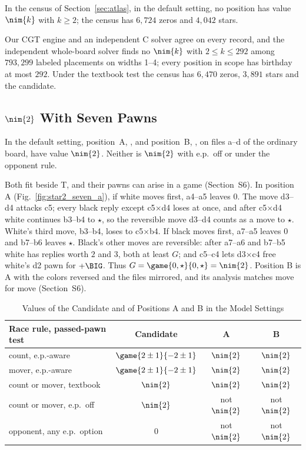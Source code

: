 \begin{theorem}\label{thm:census}
In the census of Section~\ref{sec:atlas}, in the default setting, no position has value $\nim{k}$ with
$k\ge2$; the census has $6{,}724$ zeros and $4{,}042$ stars.
\end{theorem}

Our CGT engine and an independent C solver agree on every record, and the independent whole-board solver
finds no $\nim{k}$ with $2\le k\le 292$ among $793{,}299$ labeled placements on widths 1--4; every position in
scope has birthday at most $292$. Under the textbook test the census has $6{,}470$ zeros, $3{,}891$ stars and the candidate.

\subsection{\texorpdfstring{$\nim{2}$}{*2} With Seven Pawns}

\begin{theorem}\label{thm:star2seven}
In the default setting, position~A, , and position~B,
, on files a--d of the ordinary board, have value $\nim{2}$. Neither is $\nim{2}$
with e.p.\ off or under the opponent rule.
\end{theorem}

Both fit beside T, and their pawns can arise in a game (Section~S6). In position A (Fig.~\ref{fig:star2_seven_a}), if white moves first, a4--a5 leaves $0$. The move d3--d4 attacks
c5; every black reply except c5$\times$d4 loses at once, and after c5$\times$d4 white continues b3--b4 to
$\star$, so the reversible move d3--d4 counts as a move to $\star$. White's third move, b3--b4, loses to
c5$\times$b4. If black moves first, a7--a5 leaves $0$ and b7--b6 leaves $\star$. Black's other moves are
reversible: after a7--a6 and b7--b5 white has replies worth $2$ and $3$, both at least $G$; and c5--c4
lets d3$\times$c4 free white's d2 pawn for $+\BIG$. Thus $G=\game{0,\star}{0,\star}=\nim{2}$. Position B is A
with the colors reversed and the files mirrored, and its analysis matches move for move (Section~S6).

\begin{table}[!t]
\centering
\caption{Values of the Candidate and of Positions A and B in the Model Settings}
\label{tab:star2_settings}
\footnotesize
\setlength{\tabcolsep}{4pt}
\begin{tabular}{@{}lccc@{}}
\toprule
Race rule, passed-pawn test & Candidate & A & B\\
\midrule
count, e.p.-aware & $\game{2\pm1}{-2\pm1}$ & $\nim{2}$ & $\nim{2}$\\
mover, e.p.-aware & $\game{2\pm1}{-2\pm1}$ & $\nim{2}$ & $\nim{2}$\\
count or mover, textbook & $\nim{2}$ & $\nim{2}$ & $\nim{2}$\\
count or mover, e.p.\ off & $\nim{2}$ & not $\nim{2}$ & not $\nim{2}$\\
opponent, any e.p.\ option & $0$ & not $\nim{2}$ & not $\nim{2}$\\
\bottomrule
\end{tabular}
\end{table}

